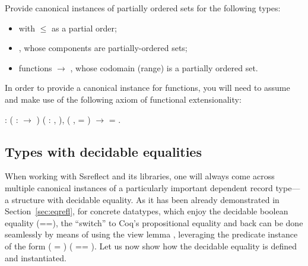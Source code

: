 \begin{exercise}


Provide canonical instances of partially ordered sets for the
following types:



\begin{itemize}
\item  {} with \ensuremath{\le} as a partial order;

\item  {}, whose components are partially-ordered sets;

\item  functions  \ensuremath{\rightarrow} , whose codomain (range)  is a partially
  ordered set.

\end{itemize}


In order to provide a canonical instance for functions, you will need
to assume and make use of the following axiom of functional
extensionality:




\begin{coqdoccode}
\coqdocemptyline
\coqdocnoindent
{}  : \coqdockw{\ensuremath{\forall}}  ( :  \ensuremath{\rightarrow} ) (  : \coqdockw{\ensuremath{\forall}} ,  ), \coqdoceol
\coqdocindent{7.50em}
(\coqdockw{\ensuremath{\forall}} ,   =  ) \ensuremath{\rightarrow}  = .\coqdoceol
\coqdocemptyline
\end{coqdoccode}
\end{exercise}


\subsection{Types with decidable equalities}




When working with Ssreflect and its libraries, one will always come
across multiple canonical instances of a particularly important
dependent record type---a structure with decidable equality. As it has
been already demonstrated in Section~\ref{sec:eqrefl}, for concrete
datatypes, which enjoy the decidable boolean equality (==), the
``switch'' to Coq's propositional equality and back can be done
seamlessly by means of using the view lemma , leveraging the
 predicate instance of the form  ( = ) ( ==
). Let us now show how the decidable equality is
defined and instantiated.


